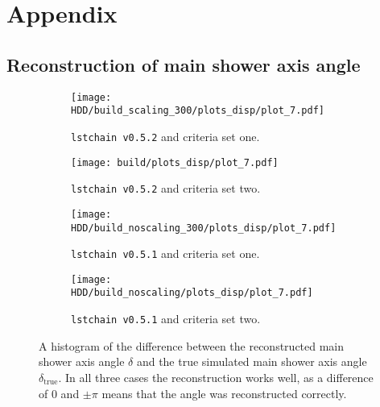 \chapter{Appendix}

\section{Reconstruction of main shower axis angle}
\begin{figure}
    \centering
    \begin{subfigure}{0.49\textwidth}
        \centering
        \texttt{[image: HDD/build\_scaling\_300/plots\_disp/plot\_7.pdf]}
        \caption{\texttt{lstchain v0.5.2} and criteria set one.}
    \end{subfigure}
    \hfill
    \begin{subfigure}{0.49\textwidth}
        \centering
        \texttt{[image: build/plots\_disp/plot\_7.pdf]}
        \caption{\texttt{lstchain v0.5.2} and criteria set two.}
    \end{subfigure}
    \newline\vfill
    \begin{subfigure}{0.49\textwidth}
        \centering
        \texttt{[image: HDD/build\_noscaling\_300/plots\_disp/plot\_7.pdf]}
        \caption{\texttt{lstchain v0.5.1} and criteria set one.}
    \end{subfigure}
    \hfill
    \begin{subfigure}{0.49\textwidth}
        \centering
        \texttt{[image: HDD/build\_noscaling/plots\_disp/plot\_7.pdf]}
        \caption{\texttt{lstchain v0.5.1} and criteria set two.}
    \end{subfigure}
    \caption{A histogram of the difference between the reconstructed main shower axis angle $\delta$ and the true simulated main shower axis angle $\delta_\text{true}$.
        In all three cases the reconstruction works well, as a difference of $\num{0}$ and $\pm \pi$ means that the angle was reconstructed correctly.
    }
    \label{fig:delta_comparison}
\end{figure}


